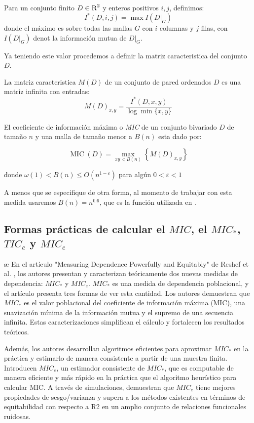 	\begin{defn}
		Para un conjunto finito $D\in\textsc{R}^2$ y enteros positivos $i,j$, definimos:
		$$
		I^*(D,i,j)=\max I(D|_G)
		$$
		donde el m\'aximo es sobre todas las mallas $G$ con $i$ columnas y $j$ filas, con $I(D|_G)$ denot la informaci\'on mutua de $D|_G$.
	\end{defn}

	Ya teniendo este valor procedemos a definir la matriz caracteristica del conjunto $D$.

	\begin{defn}
		La matriz caracteristica $M(D)$ de un conjunto de pared ordenados $D$ es una matriz infinita con entradas:
		$$
		M(D)_{x, y}=\frac{I^{*}(D, x, y)}{\log \min \{x, y\}}
		$$
	\end{defn}
	\begin{defn}
		El coeficiente de informaci\'on m\'axima o \textit{MIC} de un conjunto bivariado $D$ de tama\~no $n$ y una malla de tama\~no menor a $B(n)$ esta dado por:

		$$
		\operatorname{MIC}(D)=\max _{x y<B(n)}\left\{M(D)_{x, y}\right\}
		$$

		donde $\omega(1)<B(n) \leq O\left(n^{1-\varepsilon}\right)$ para alg\'un $0<\varepsilon<1$ 
	\end{defn}
	\begin{rem}
		A menos que se especifique de otra forma, al momento de trabajar con esta medida usaremos $B(n)=n^{0.6}$, que es la funci\'on utilizada en \cite{Reshef2011}.
	\end{rem}

	\subsection[Formas practicas de calcular el MIC, el MIC*, TICe y MICe]{Formas pr\'acticas de calcular el $MIC$, el $MIC_*$, $TIC_e$ y $MIC_e$}
æ
	En el art\'iculo "Measuring Dependence Powerfully and Equitably" de Reshef et al. \cite{Reshef2016}, los autores presentan y caracterizan te\'oricamente dos nuevas medidas de dependencia: $MIC_*$ y $MIC_e$. $MIC_*$ es una medida de dependencia poblacional, y el art\' iculo presenta tres formas de ver esta cantidad. Los autores demuestran que $MIC_*$ es el valor poblacional del coeficiente de informaci\'on m\'axima (MIC), una suavizaci\'on m\'inima de la informaci\'on mutua y el supremo de una secuencia infinita. Estas caracterizaciones simplifican el c\'alculo y fortalecen los resultados te\'oricos.

	Adem\'as, los autores desarrollan algoritmos eficientes para aproximar $MIC_*$ en la pr\'actica y estimarlo de manera consistente a partir de una muestra finita. Introducen $MIC_e$, un estimador consistente de $MIC_*$, que es computable de manera eficiente y m\'as r\'apido en la pr\'actica que el algoritmo heur\'istico para calcular MIC. A trav\'es de simulaciones, demuestran que $MIC_e$ tiene mejores propiedades de sesgo/varianza y supera a los m\'etodos existentes en t\'erminos de equitabilidad con respecto a R2 en un amplio conjunto de relaciones funcionales ruidosas.

